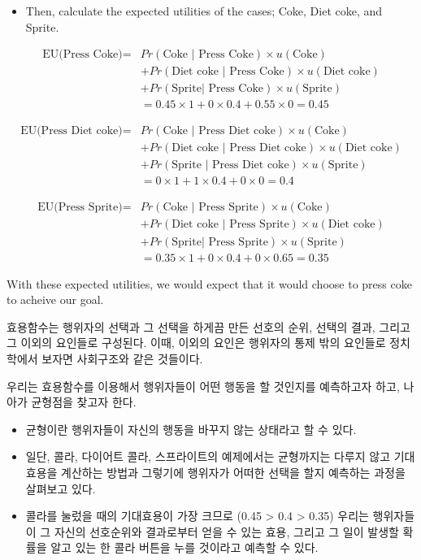 \documentclass[]{book}
\providecommand{\tightlist}{%
  \setlength{\itemsep}{0pt}\setlength{\parskip}{0pt}}
\begin{document}
\begin{itemize}
\tightlist
\item
  Then, calculate the expected utilities of the cases; Coke, Diet coke, and Sprite.
\end{itemize}

\[\begin{aligned} \text{EU(Press Coke)}=&Pr(\text{Coke | Press Coke})\times u(\text{Coke})\\
    &+ Pr(\text{Diet coke | Press Coke})\times u(\text{Diet coke})\\
    &+ Pr(\text{Sprite| Press Coke})\times u(\text{Sprite})\\
    &= 0.45 \times 1 + 0 \times 0.4 + 0.55 \times 0 = 0.45
    \end{aligned}\]

\[\begin{aligned} \text{EU(Press Diet coke)}=&Pr(\text{Coke | Press Diet coke})\times u(\text{Coke})\\
    &+ Pr(\text{Diet coke | Press Diet coke})\times u(\text{Diet coke})\\
    &+ Pr(\text{Sprite | Press Diet coke})\times u(\text{Sprite})\\
    &= 0 \times 1 + 1 \times 0.4 + 0 \times 0 = 0.4
    \end{aligned}\]

\[\begin{aligned} \text{EU(Press Sprite)}=&Pr(\text{Coke | Press Sprite})\times u(\text{Coke})\\
    &+ Pr(\text{Diet coke | Press Sprite})\times u(\text{Diet coke})\\
    &+ Pr(\text{Sprite| Press Sprite})\times u(\text{Sprite})\\
    &= 0.35 \times 1 + 0 \times 0.4 + 0 \times 0.65 = 0.35
    \end{aligned}\]

With these expected utilities, we would expect that it would choose to press coke to acheive our goal.

효용함수는 행위자의 선택과 그 선택을 하게끔 만든 선호의 순위, 선택의 결과, 그리고 그 이외의 요인들로 구성된다. 이때, 이외의 요인은 행위자의 통제 밖의 요인들로 정치학에서 보자면 사회구조와 같은 것들이다.

우리는 효용함수를 이용해서 행위자들이 어떤 행동을 할 것인지를 예측하고자 하고, 나아가 균형점을 찾고자 한다.

\begin{itemize}
\tightlist
\item
  균형이란 행위자들이 자신의 행동을 바꾸지 않는 상태라고 할 수 있다.
\item
  일단, 콜라, 다이어트 콜라, 스프라이트의 예제에서는 균형까지는 다루지 않고 기대효용을 계산하는 방법과 그렇기에 행위자가 어떠한 선택을 할지 예측하는 과정을 살펴보고 있다.
\item
  콜라를 눌렀을 때의 기대효용이 가장 크므로 (0.45 \textgreater{} 0.4 \textgreater{} 0.35) 우리는 행위자들이 그 자신의 선호순위와 결과로부터 얻을 수 있는 효용, 그리고 그 일이 발생할 확률을 알고 있는 한 콜라 버튼을 누를 것이라고 예측할 수 있다.
\end{itemize}
\end{document}
